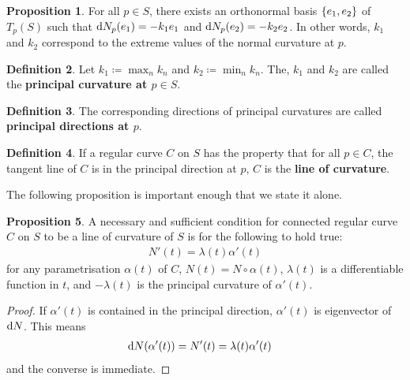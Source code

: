 \documentclass{amsart} %
\theoremstyle{mytheoremstyle}
\theoremstyle{definition}
\newtheorem{definition}{Definition}[section]
\newtheorem{proposition}[definition]{Proposition}
\numberwithin{equation}{section}
\DeclareMathOperator{\1}{\mathbbm{1}}
\DeclareMathOperator{\D}{\dif}
\begin{document}
\begin{proposition}
	\label{propeigenvaluesinducebasis}
	For all $p \in S$, there exists an orthonormal basis $\set{e_1,e_2}$ of $T_p (S)$ such that $\D N_p (e_1) = -k_1 e_1$ and $\D N_p (e_2) = -k_2 e_2$. In other words, $k_1$ and $k_2$ correspond to the extreme values of the normal curvature at $p$.
\end{proposition}


\begin{definition}
	\label{defprincipalcurvature}
	Let $k_1 \coloneqq \max_n k_n$ and $k_2 \coloneqq \min_n k_n$. The, $k_1$ and $k_2$ are called the \textbf{principal curvature at $p \in S$}.
\end{definition}

\begin{definition}
	\label{defprincipaldirection}
	The corresponding directions of principal curvatures are called \textbf{principal directions at $p$}.
\end{definition}

\begin{definition}
	\label{deflineofcurvature}
	If a regular curve $C$ on $S$ has the property that for all $p \in C$, the tangent line of $C$ is in the principal direction at $p$, $C$ is the \textbf{line of curvature}.
\end{definition}

The following proposition is important enough that we state it alone.

\begin{proposition}
	\label{propolinderodrigues}
	A necessary and sufficient condition for connected regular curve $C$ on $S$ to be a line of curvature of $S$ is for the following to hold true:
	\begin{align}
		\label{eqolinderodrigues}
		N'(t) = \lambda(t) \alpha'(t)
	\end{align}
	for any parametrisation $\alpha(t)$ of $C$, $N(t) = N \circ \alpha(t)$, $\lambda(t) $ is a differentiable function in $t$, and $-\lambda(t)$ is the principal curvature of $\alpha'(t)$.
\end{proposition}


\begin{proof}
	If $\alpha'(t)$ is contained in the principal direction, $\alpha'(t)$ is eigenvector of $\D N$. This means
	\begin{align*}
	\D N(\alpha'(t)) &= N'(t) = \lambda(t) \alpha'(t)
	\end{align*}
	and the converse is immediate.
\end{proof}
\end{document}
